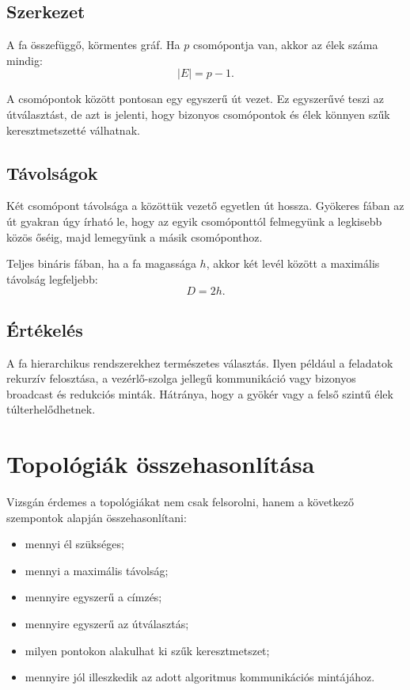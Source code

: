 \subsection{Szerkezet}

A fa összefüggő, körmentes gráf. Ha $p$ csomópontja van, akkor az élek száma mindig:
\[
  |E|=p-1.
\]

A csomópontok között pontosan egy egyszerű út vezet. Ez egyszerűvé teszi az útválasztást, de azt is jelenti, hogy bizonyos csomópontok és élek könnyen szűk keresztmetszetté válhatnak.

\subsection{Távolságok}

Két csomópont távolsága a közöttük vezető egyetlen út hossza. Gyökeres fában az út gyakran úgy írható le, hogy az egyik csomóponttól felmegyünk a legkisebb közös őséig, majd lemegyünk a másik csomóponthoz.

Teljes bináris fában, ha a fa magassága $h$, akkor két levél között a maximális távolság legfeljebb:
\[
  D=2h.
\]

\subsection{Értékelés}

A fa hierarchikus rendszerekhez természetes választás. Ilyen például a feladatok rekurzív felosztása, a vezérlő-szolga jellegű kommunikáció vagy bizonyos broadcast és redukciós minták. Hátránya, hogy a gyökér vagy a felső szintű élek túlterhelődhetnek.

\section{Topológiák összehasonlítása}

\begin{center}

\end{center}

Vizsgán érdemes a topológiákat nem csak felsorolni, hanem a következő szempontok alapján összehasonlítani:

\begin{itemize}
  \item mennyi él szükséges;
  \item mennyi a maximális távolság;
  \item mennyire egyszerű a címzés;
  \item mennyire egyszerű az útválasztás;
  \item milyen pontokon alakulhat ki szűk keresztmetszet;
  \item mennyire jól illeszkedik az adott algoritmus kommunikációs mintájához.
\end{itemize}

